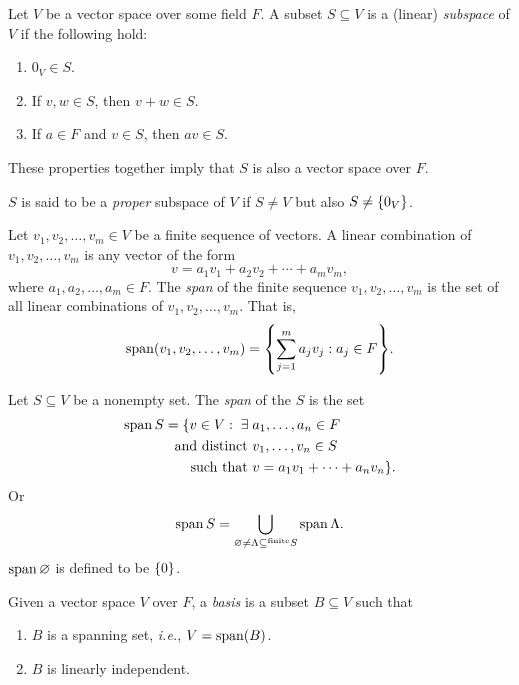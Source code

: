 \documentclass[12pt]{article}
\begin{document}
\begin{defn}[Subspace] \label{defn:vector:subspace}
    Let $V$ be a vector space over some field $F$.
    A subset $S \subseteq V$ is a (linear) \emph{subspace} of $V$ if the following hold:
    \begin{enumerate}[label=(\alph*)]
        \item $0_{V} \in S$.
        \item If $v, w \in S$, then $v + w \in S$.
        \item If $a \in F$ and $v \in S$, then $a v \in S$.
    \end{enumerate}
    These properties together imply that $S$ is also a vector space over $F$.

    $S$ is said to be a \emph{proper} subspace of $V$ if $S \neq V$ but also $S \neq \set{0_{V}}$.
\end{defn}

\begin{defn} \label{defn:vector:span:finite_sequence}
    Let $v_{1}, v_{2}, \dots, v_{m} \in V$ be a finite sequence of vectors.
    A linear combination of $v_{1}, v_{2}, \dots, v_{m}$ is any vector of the form \[
        v = a_{1} v_{1} + a_{2} v_{2} + \cdots + a_{m} v_{m},
    \] where $a_{1}, a_{2}, \dots, a_{m} \in F$.
    The \emph{span} of the finite sequence $v_{1}, v_{2}, \dots, v_{m}$ is the set of all linear combinations of $v_{1}, v_{2}, \dots, v_{m}$.
    That is, \[
        \spann(v_{1}, v_{2}, \dots, v_{m}) = \set{\sum_{j = 1}^{m} a_{j} v_{j} : a_{j} \in F}.
    \]
\end{defn}

\begin{defn} \label{defn:vector:span:set}
    Let $S \subseteq V$ be a nonempty set. The \emph{span} of the $S$ is the set \begin{align*}
        \operatorname{span} S = \{v \in V : \;\exists\; &a_1, \dots, a_n \in F \\
        \text{and distinct } &v_1, \dots, v_n \in S \\
        \text{such that } &v = a_1 v_1 + \cdots + a_n v_n\}.
    \end{align*}
    Or \[
        \operatorname{span} S = \bigcup_{\varnothing \neq \Lambda \subseteq ^{\mathrm{finite}} S} \operatorname{span} \Lambda.
    \]
    $\operatorname{span} \varnothing$ is defined to be $\set{0}$.
\end{defn}

\begin{defn}[Basis] \label{defn:basis}
    Given a vector space $V$ over $F$, a \emph{basis} is a subset $B \subseteq V$ such that
    \begin{enumerate}[label=(\alph*)]
        \item $B$ is a spanning set, \textit{i.e.}, $V = \operatorname{span}(B)$.
        \item $B$ is linearly independent.
    \end{enumerate}
\end{defn}
\end{document}
